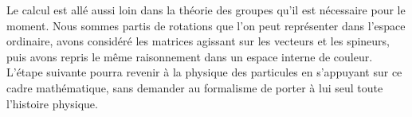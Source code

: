 Le calcul est allé aussi loin dans la théorie des groupes qu’il est nécessaire pour le moment. Nous sommes partis de rotations que l’on peut représenter dans l’espace ordinaire, avons considéré les matrices agissant sur les vecteurs et les spineurs, puis avons repris le même raisonnement dans un espace interne de couleur. L’étape suivante pourra revenir à la physique des particules en s’appuyant sur ce cadre mathématique, sans demander au formalisme de porter à lui seul toute l’histoire physique.
